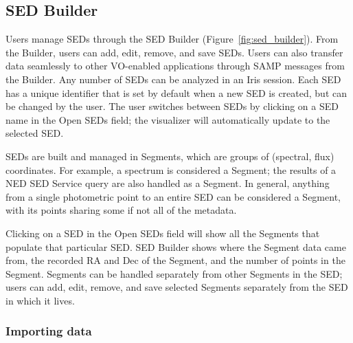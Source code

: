 \documentclass[final,5p,authoryear]{elsarticle}
\begin{document}
\subsection{SED Builder}

Users manage SEDs through the SED Builder (Figure~\ref{fig:sed_builder}). From
the Builder, users can add, edit, remove, and save SEDs. Users can also transfer
data seamlessly to other VO-enabled applications through SAMP messages from the
Builder. Any number of SEDs can be analyzed in an Iris session. Each SED has a
unique identifier that is set by default when a new SED is created, but can be
changed by the user. The user switches between SEDs by clicking on a SED name in
the Open SEDs field; the visualizer will automatically update to the selected
SED.

SEDs are built and managed in Segments, which are groups of (spectral, flux)
coordinates. For example, a spectrum is considered a Segment; the results of a
NED SED Service query are also handled as a Segment. In general, anything from a
single photometric point to an entire SED can be considered a Segment, with its
points sharing some if not all of the metadata.

Clicking on a SED in the Open SEDs field will show all the Segments that
populate that particular SED. SED Builder shows where the Segment data came
from, the recorded RA and Dec of the Segment, and the number of points in the
Segment. Segments can be handled separately from other Segments in the SED;
users can add, edit, remove, and save selected Segments separately from the SED
in which it lives.

\subsubsection{Importing data}
\end{document}
